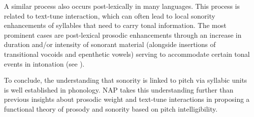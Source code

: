 A similar process also occurs post-lexically in many languages. This process is related to text-tune interaction, which can often lead to local sonority enhancements of syllables that need to carry tonal information. The most prominent cases are post-lexical prosodic enhancements through an increase in duration and/or intensity of sonorant material (alongside insertions of transitional vocoids and epenthetic vowels) serving to accommodate certain tonal events in intonation (see \citealt{roettger2019tune}).

To conclude, the understanding that sonority is linked to pitch via syllabic units is well established in phonology.
NAP takes this understanding further than previous insights about prosodic weight and text-tune interactions in proposing a functional theory of prosody and sonority based on pitch intelligibility.

